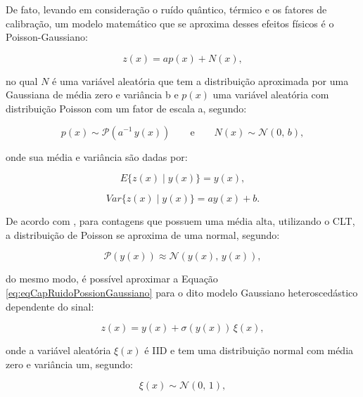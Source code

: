 De fato, levando em consideração o ruído quântico, térmico e os fatores de calibração, um modelo matemático que se aproxima desses efeitos físicos é o Poisson-Gaussiano:

\begin{equation}
z(x) = ap(x) + N(x),
\label{eq:eqCapRuidoPossionGaussiano}
\end{equation}

\noindent no qual $N$ é uma variável aleatória que tem a distribuição aproximada por uma Gaussiana de média zero e variância b e $p(x)$ uma variável aleatória com distribuição Poisson com um fator de escala a, segundo:

\begin{equation}
p(x) \sim \mathcal{P}(a^{-1}\,y(x)) \qquad \text{e}  \qquad  N(x) \sim \mathcal{N}(0,\,b),
\label{eq:eqCapRuidoPossionGaussiano1}
\end{equation}

\noindent onde sua média e variância são dadas por:

\begin{equation}
E\{z(x)\mid y(x)\} =  y(x),
\label{eq:eqCapRuidoPossionGaussianoMedia}
\end{equation}

\begin{equation}
Var\{z(x)\mid y(x)\} = ay(x) + b.
\label{eq:eqCapRuidoPossionGaussianoVar}
\end{equation}

De acordo com , para contagens que possuem uma média alta, utilizando o \acs{CLT}, a distribuição de Poisson se aproxima de uma normal, segundo:

\begin{equation}
\mathcal{P}(y(x)) \approx \mathcal{N}(y(x),\,y(x)),
\label{eq:eqCapRuidoPossionGaussianoAproximacao}
\end{equation}

\noindent do mesmo modo, é possível aproximar  a Equação \ref{eq:eqCapRuidoPossionGaussiano} para o dito modelo Gaussiano heteroscedástico dependente do sinal:

\begin{equation}
z(x) = y(x) + \sigma(y(x)) \, \xi(x),
\label{eq:eqCapRuidoHeteroscedastico}
\end{equation}

\noindent onde a variável aleatória  $\xi(x)$ é \acs{IID} e tem uma distribuição normal com média zero e variância um, segundo:

\begin{equation}
\xi(x) \sim  \mathcal{N}(0,\,1),
\label{eq:eqCapRuidoHeteroscedastico1}
\end{equation}

